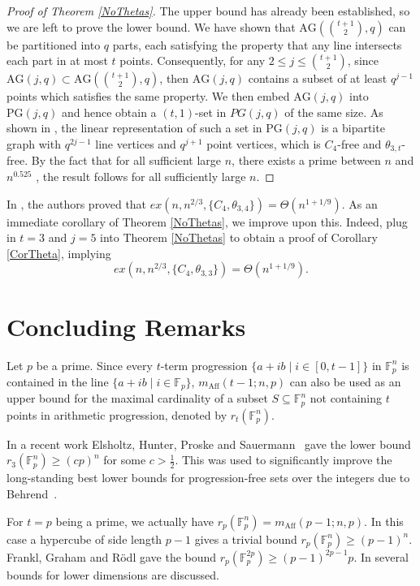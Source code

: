 \documentclass[12pt]{article}
\newcommand{\PG}{\text{PG}}
\newcommand{\AG}{\text{AG}}
\newcommand{\mpa}[3]{m_{\text{Aff}}(#1 ; #2, #3)}
\begin{document}
\begin{proof}[Proof of Theorem \ref{NoThetas}]
    The upper bound has already been established, so we are left to prove the lower bound. 
    We have shown that $\AG(\binom{t+1}{2}, q)$ can be partitioned into $q$ parts, each satisfying the property that any line intersects each part in at most $t$ points. Consequently, for any $2 \leq j \leq \binom{t+1}{2}$, since $\AG(j, q) \subset \AG(\binom{t+1}{2}, q)$, then $\AG(j, q)$ contains a subset of at least $q^{j-1}$ points which satisfies the same property. We then embed $\AG(j, q)$ into $\PG(j, q)$ and hence obtain a $(t, 1)$-set in $PG(j, q)$ of the same size. As shown in \cite{DuzgunRietTaranchuk2025}, the linear representation of such a set in $\PG(j, q)$ is a bipartite graph with $q^{2j - 1}$ line vertices and  $q^{j+1}$ point vertices, which is $C_4$-free and $\theta_{3, t}$-free. By the fact that for all sufficient large $n$, there exists a prime between $n$ and $n^{0.525}$ \cite{BakerHarmanPintz2001}, the result follows for all sufficiently large $n$. 
\end{proof}

In \cite{DuzgunRietTaranchuk2025}, the authors proved that $ex(n, n^{2/3}, \{C_4, \theta_{3, 4}\}) = \Theta(n^{1 + 1/9})$. As an immediate corollary of Theorem \ref{NoThetas}, we improve upon this. Indeed, plug in $t = 3$ and $j = 5$ into Theorem \ref{NoThetas} to obtain a proof of Corollary \ref{CorTheta}, implying
$$
ex(n, n^{2/3}, \{C_4, \theta_{3, 3}\}) = \Theta(n^{1 + 1/9}).
$$


\section{Concluding Remarks}

Let $p$ be a prime. Since every $t$-term progression $\{a+ib\;|\;i\in[0,t-1]\}$ in $\mathbb{F}_p^n$ is contained in the line $\{a+ib\;|\;i\in\mathbb{F}_p\}$, $\mpa{t-1}{n}{p}$ can also be used as an upper bound for the maximal cardinality of a subset $S\subseteq \mathbb{F}_p^n$ not containing $t$ points in arithmetic progression, denoted by $r_t(\mathbb{F}_p^n)$.

 In a recent work Elsholtz, Hunter, Proske and Sauermann~\cite{EHPS} gave the lower bound $r_3(\mathbb{F}_p^n)\geq (cp)^n$ for some $c>\frac{1}{2}$. This was used to significantly improve the long-standing best lower bounds for progression-free sets over the integers due to Behrend~\cite{Behrend}.
 
For $t=p$ being a prime, we actually have $r_p(\mathbb{F}_p^n) = \mpa{p-1}{n}{p}$. In this case a hypercube of side length $p-1$ gives a trivial bound $r_p(\mathbb{F}_p^{n}) \geq (p-1)^n.$ Frankl, Graham and R\"odl \cite{FGR} gave the bound $r_p(\mathbb{F}_p^{2p}) \geq (p-1)^{2p-1}p.$ In \cite{EFFKPGV} several bounds for lower dimensions are discussed.
\end{document}
